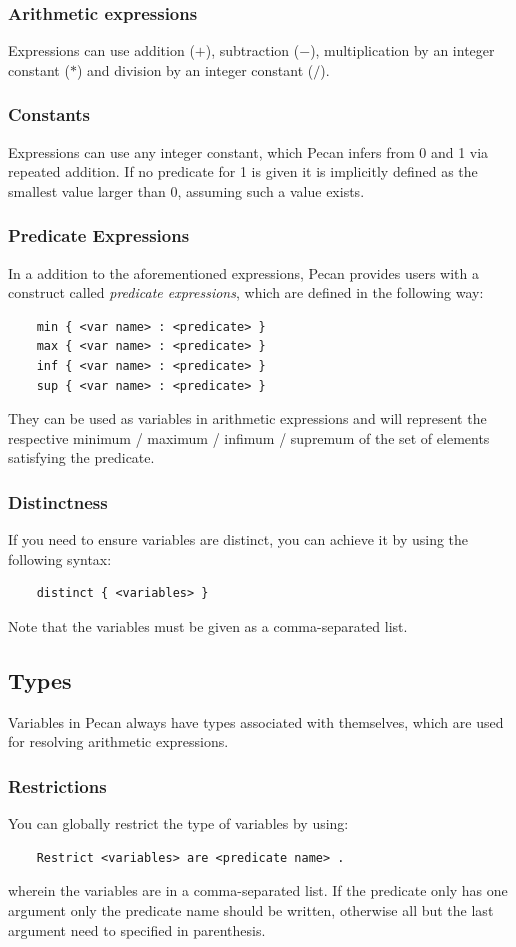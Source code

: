 \documentclass{report}
\begin{document}
\subsubsection{Arithmetic expressions}
Expressions can use addition (\(+\)), subtraction (\(-\)), multiplication by an integer constant (\(*\)) and division by an integer constant (\(/\)).

\subsubsection{Constants}
Expressions can use any integer constant, which Pecan infers from 0 and 1 via repeated addition.
If no predicate for 1 is given it is implicitly defined as the smallest value larger than 0, assuming such a value exists.

\subsubsection{Predicate Expressions}
In a addition to the aforementioned expressions, Pecan provides users with a construct called \emph{predicate expressions}, which are defined in the following way:
\begin{verbatim}
    min { <var name> : <predicate> }
    max { <var name> : <predicate> }
    inf { <var name> : <predicate> }
    sup { <var name> : <predicate> }
\end{verbatim}
They can be used as variables in arithmetic expressions and will represent the respective minimum / maximum / infimum / supremum of the set of elements satisfying the predicate.

\subsubsection{Distinctness}
If you need to ensure variables are distinct, you can achieve it by using the following syntax:
\begin{verbatim}
    distinct { <variables> }
\end{verbatim}
Note that the variables must be given as a comma-separated list.

\subsection{Types}
Variables in Pecan always have types associated with themselves, which are used for resolving arithmetic expressions.

\subsubsection{Restrictions}
You can globally restrict the type of variables by using:
\begin{verbatim}
    Restrict <variables> are <predicate name> .
\end{verbatim}
wherein the variables are in a comma-separated list.
If the predicate only has one argument only the predicate name should be written, otherwise all but the last argument need to specified in parenthesis.
\end{document}
